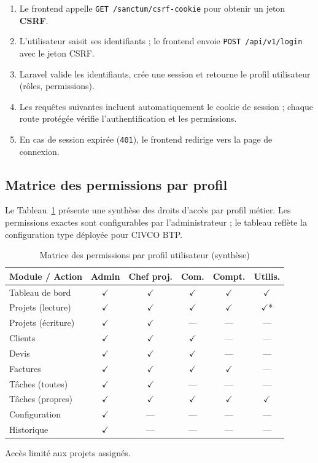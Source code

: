 \begin{enumerate}
  \item Le frontend appelle \texttt{GET /sanctum/csrf-cookie} pour obtenir un jeton
  \textbf{CSRF}.
  \item L'utilisateur saisit ses identifiants ; le frontend envoie
  \texttt{POST /api/v1/login} avec le jeton CSRF.
  \item Laravel valide les identifiants, crée une session et retourne le profil
  utilisateur (rôles, permissions).
  \item Les requêtes suivantes incluent automatiquement le cookie de session ;
  chaque route protégée vérifie l'authentification et les permissions.
  \item En cas de session expirée (\texttt{401}), le frontend redirige vers la page
  de connexion.
\end{enumerate}

\subsection{Matrice des permissions par profil}

Le Tableau~\ref{tab:permissions} présente une synthèse des droits d'accès par profil
métier. Les permissions exactes sont configurables par l'administrateur ; le tableau
reflète la configuration type déployée pour CIVCO BTP.

\begin{table}[H]
\caption{Matrice des permissions par profil utilisateur (synthèse)}
\label{tab:permissions}
\centering
\small
\begin{tabular}{|l|c|c|c|c|c|}
\hline
\textbf{Module / Action} & \textbf{Admin} & \textbf{Chef proj.} & \textbf{Com.} &
\textbf{Compt.} & \textbf{Utilis.} \\
\hline
Tableau de bord & $\checkmark$ & $\checkmark$ & $\checkmark$ & $\checkmark$ & $\checkmark$ \\
\hline
Projets (lecture) & $\checkmark$ & $\checkmark$ & $\checkmark$ & $\checkmark$ & $\checkmark$* \\
\hline
Projets (écriture) & $\checkmark$ & $\checkmark$ & --- & --- & --- \\
\hline
Clients & $\checkmark$ & $\checkmark$ & $\checkmark$ & --- & --- \\
\hline
Devis & $\checkmark$ & $\checkmark$ & $\checkmark$ & --- & --- \\
\hline
Factures & $\checkmark$ & $\checkmark$ & $\checkmark$ & $\checkmark$ & --- \\
\hline
Tâches (toutes) & $\checkmark$ & $\checkmark$ & --- & --- & --- \\
\hline
Tâches (propres) & $\checkmark$ & $\checkmark$ & $\checkmark$ & $\checkmark$ & $\checkmark$ \\
\hline
Configuration & $\checkmark$ & --- & --- & --- & --- \\
\hline
Historique & $\checkmark$ & --- & --- & --- & --- \\
\hline
\end{tabular}

\vspace{0.2cm}
{\footnotesize * Accès limité aux projets assignés.}
\end{table}

